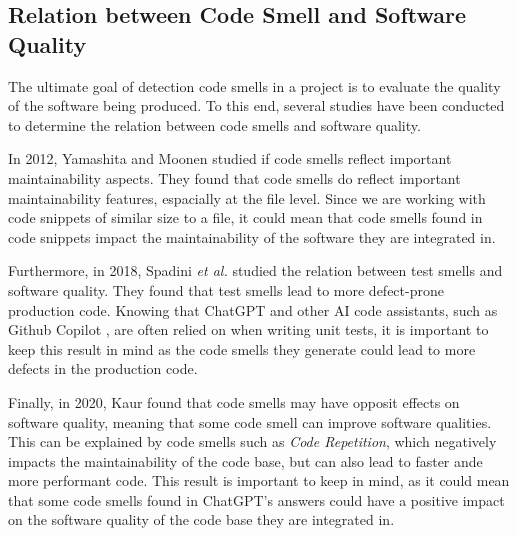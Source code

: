 \subsection{Relation between Code Smell and Software Quality}
\label{sec:related-work-relation-between-code-smell-and-software-quality}
The ultimate goal of detection code smells in a project is to evaluate the quality of the software being produced. To this end, several studies have been conducted to determine the relation between code smells and software quality.

In 2012, Yamashita and Moonen \cite{yamashita-2012} studied if code smells reflect important maintainability aspects. They found that code smells do reflect important maintainability features, espacially at the file level. Since we are working with code snippets of similar size to a file, it could mean that code smells found in code snippets impact the maintainability of the software they are integrated in.

Furthermore, in 2018, Spadini \textit{et al.} \cite{spadini-2018} studied the relation between test smells and software quality. They found that test smells lead to more defect-prone production code. Knowing that ChatGPT and other AI code assistants, such as Github Copilot \cite{github-copilot}, are often relied on when writing unit tests, it is important to keep this result in mind as the code smells they generate could lead to more defects in the production code.

Finally, in 2020, Kaur \cite{kaur-2020} found that code smells may have opposit effects on software quality, meaning that some code smell can improve software qualities. This can be explained by code smells such as \textit{Code Repetition}, which negatively impacts the maintainability of the code base, but can also lead to faster ande more performant code. This result is important to keep in mind, as it could mean that some code smells found in ChatGPT's answers could have a positive impact on the software quality of the code base they are integrated in.